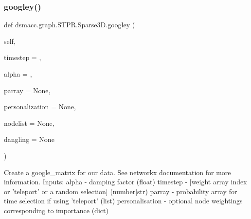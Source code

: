\subsubsection{\texorpdfstring{googley()}{googley()}}
{\footnotesize\ttfamily def dsmacc.\+graph.\+S\+T\+P\+R.\+Sparse3\+D.\+googley (\begin{DoxyParamCaption}\item[{}]{self,  }\item[{}]{timestep = {},  }\item[{}]{alpha = {},  }\item[{}]{parray = {\ttfamily None},  }\item[{}]{personalization = {\ttfamily None},  }\item[{}]{nodelist = {\ttfamily None},  }\item[{}]{dangling = {\ttfamily None} }\end{DoxyParamCaption})}

\begin{DoxyVerb}Create a google_matrix for our data. See networkx documentation for more information. 
  Inputs: 
    alpha - damping factor (float)
    timestep - [weight array index or 'teleport' or a random selection] (number|str)
    parray - probability array for time selection if using 'teleport' (list)
    personalisation - optional node weightings corresponding to importance (dict)\end{DoxyVerb}
 
